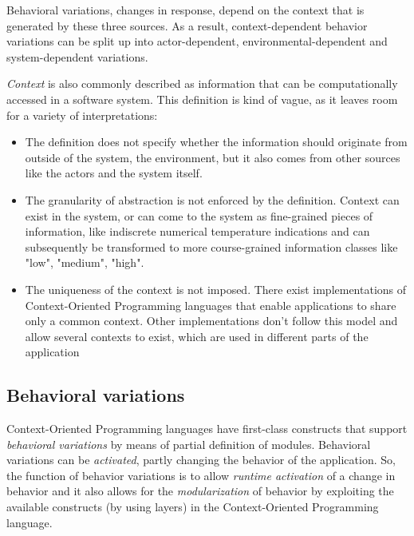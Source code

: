 \documentclass{acm_proc_article-sp}
\begin{document}
Behavioral variations, changes in response, depend on the context that is generated by these three sources. As a result, context-dependent behavior variations can be split up into actor-dependent, environmental-dependent and  system-\linebreak dependent variations.

\textit{Context} is also commonly described as information that can be computationally accessed in a software system. This definition is kind of vague, as it leaves room for a variety of interpretations:

\begin{itemize}
\item The definition does not specify whether the information should originate from outside of the system, the environment, but it also comes from other sources like the actors and the system itself.
\item The granularity of abstraction is not enforced by the definition. Context can exist in the system, or can come to the system as fine-grained pieces of information, like indiscrete numerical temperature indications and can subsequently be transformed to more course-grained information classes like "low", "medium", "high". 
\item The uniqueness of the context is not imposed. There exist implementations of Context-Oriented Programming languages that enable applications to share only a common context. Other implementations don't follow this model and allow several contexts to exist, which are used in different parts of the application \cite{Appeltauer:2009:CCP:1562112.1562118}
\end{itemize}

\subsection{Behavioral variations}
\label{sec:behavioral_variations}
Context-Oriented Programming languages have first-class constructs that support \textit{behavioral variations} by means of partial definition of modules. Behavioral variations can be \textit{activated}, partly changing the behavior of the application. So, the function of behavior variations is to allow \textit{runtime activation} of a change in behavior and it also allows for the \textit{modularization} of behavior by exploiting the available constructs (by using layers) in the Context-Oriented Programming language.    
\end{document}
